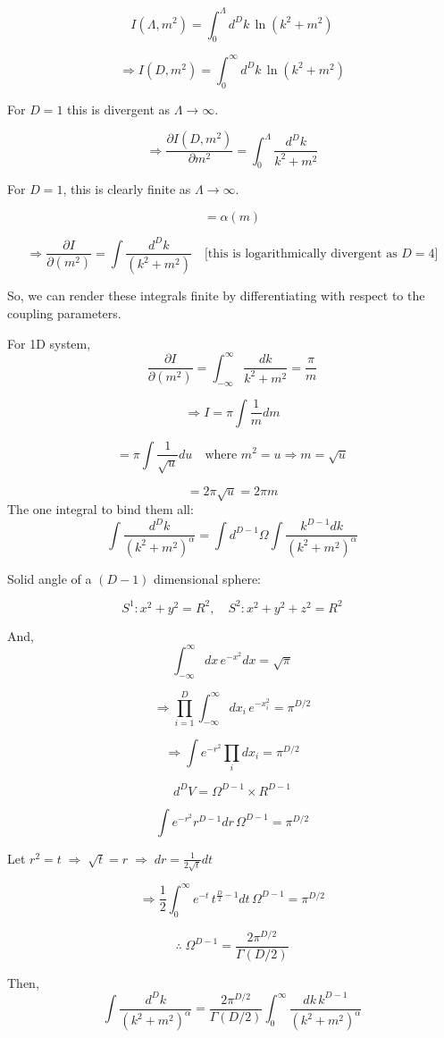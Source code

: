 \documentclass[14pt]{article} %
\begin{document}
\[
I(\Lambda,m^2) = \int_0^\Lambda d^Dk \, \ln (k^2+m^2)
\]

\[
\Rightarrow I(D,m^2) = \int_0^\infty d^Dk \, \ln (k^2+m^2)
\]

For $D=1$ this is divergent as $\Lambda \to \infty$.

\[
\Rightarrow \frac{\partial I(D,m^2)}{\partial m^2} = \int_0^\Lambda \frac{d^Dk}{k^2+m^2}
\]

For $D=1$, this is clearly finite as $\Lambda \to \infty$.

\[
= \alpha(m)
\]

\[
\Rightarrow \frac{\partial I}{\partial (m^2)} = \int \frac{d^Dk}{(k^2+m^2)}
\quad \text{[this is logarithmically divergent as $D=4$]}
\]

So, we can render these integrals finite by differentiating with respect to the coupling parameters.

For 1D system,
\[
\frac{\partial I}{\partial (m^2)} = \int_{-\infty}^\infty \frac{dk}{k^2+m^2} = \frac{\pi}{m}
\]

\[
\Rightarrow I = \pi \int \frac{1}{m} dm
\]

\[
= \pi \int \frac{1}{\sqrt{u}} du
\quad\text{where } m^2 = u \Rightarrow m = \sqrt{u}
\]

\[
= 2\pi \sqrt{u} = 2\pi m
\]
The one integral to bind them all:
\[
\int \frac{d^Dk}{(k^2+m^2)^\alpha} = \int d^{D-1}\Omega \int \frac{k^{D-1} dk}{(k^2+m^2)^\alpha}
\]

Solid angle of a $(D-1)$ dimensional sphere:

\[
S^1: x^2+y^2 = R^2, \quad S^2: x^2+y^2+z^2 = R^2
\]

And,
\[
\int_{-\infty}^\infty dx \, e^{-x^2} dx = \sqrt{\pi}
\]

\[
\Rightarrow \prod_{i=1}^D \int_{-\infty}^\infty dx_i \, e^{-x_i^2} = \pi^{D/2}
\]

\[
\Rightarrow \int e^{-r^2} \prod_i dx_i = \pi^{D/2}
\]

\[
d^DV = \Omega^{D-1} \times R^{D-1}
\]

\[
\int e^{-r^2} r^{D-1} dr \, \Omega^{D-1} = \pi^{D/2}
\]

Let $r^2 = t \;\Rightarrow\; \sqrt{t} = r \;\Rightarrow\; dr = \frac{1}{2\sqrt{t}} dt$

\[
\Rightarrow \frac{1}{2} \int_0^\infty e^{-t} \, t^{\frac{D}{2}-1} dt \, \Omega^{D-1} = \pi^{D/2}
\]

\[
\therefore \; \Omega^{D-1} = \frac{2\pi^{D/2}}{\Gamma(D/2)}
\]

Then,
\[
\int \frac{d^D k}{(k^2+m^2)^\alpha}
= \frac{2\pi^{D/2}}{\Gamma(D/2)} \int_0^\infty \frac{dk \, k^{D-1}}{(k^2+m^2)^\alpha}
\]
\end{document}
